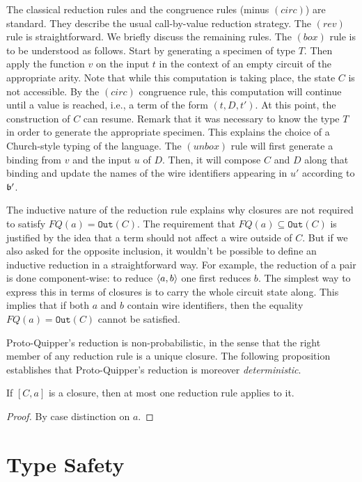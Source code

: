 \documentclass{article}
\begin{document}
The classical reduction rules and the congruence rules (minus $(circ)$) 
are standard. They describe the usual call-by-value reduction strategy. 
The $(rev)$ rule is straightforward. We briefly discuss the remaining 
rules. The $(box)$ rule is to be understood as follows. Start by 
generating a specimen of type $T$. Then apply the function $v$ on the 
input $t$ in the context of an empty circuit of the appropriate arity. 
Note that while this computation is taking place, the state $C$ is not 
accessible. By the $(circ)$ congruence rule, this computation will 
continue until a value is reached, i.e., a term of the form $(t,D,t')$. 
At this point, the construction of $C$ can resume. Remark that it was 
necessary to know the type $T$ in order to generate the appropriate 
specimen. This explains the choice of a Church-style typing of the 
language. The $(unbox)$ rule will first generate a binding from $v$ 
and the input $u$ of $D$. Then, it will compose $C$ and $D$ along that 
binding and update the names of the wire identifiers appearing in $u'$ 
according to $\mathfrak{b}'$.

The inductive nature of the reduction rule explains why closures are 
not required to satisfy $FQ(a)=\mathtt{Out}(C)$. The requirement that 
$FQ(a)\subseteq \mathtt{Out}(C)$ is justified by the idea that a term 
should not affect a wire outside of $C$. But if we also asked for the 
opposite inclusion, it wouldn't be possible to define an inductive 
reduction in a straightforward way. For example, the reduction of a 
pair is done component-wise: to reduce $\langle a,b\rangle$ one first reduces $b$. 
The simplest way to express this in terms of closures is to carry the 
whole circuit state along. This implies that if both $a$ and $b$ 
contain wire identifiers, then the equality $FQ(a)=\mathtt{Out}(C)$ 
cannot be satisfied.

Proto-Quipper's reduction is non-probabilistic, in the sense that the 
right member of any reduction rule is a unique closure. The following 
proposition establishes that Proto-Quipper's reduction is moreover  
\emph{deterministic}.

\begin{proposition}
\label{determinicity}
If $[C,a]$ is a closure, then at most one reduction rule applies
to it.
\end{proposition}

\begin{proof}
By case distinction on $a$.
\end{proof}


\section{Type Safety}
\end{document}
